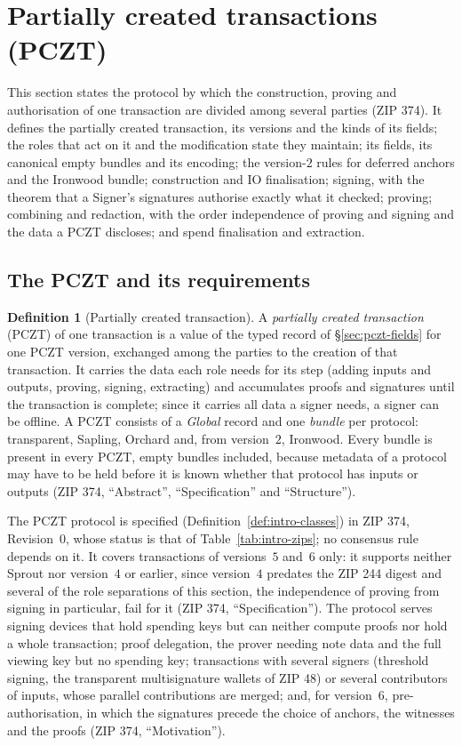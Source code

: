 \documentclass[11pt,a4paper]{article}
\theoremstyle{definition}
\newtheorem{definition}[theorem]{Definition}
\begin{document}
\section{Partially created transactions (PCZT)}\label{sec:pczt}

This section states the protocol by which the construction, proving and
authorisation of one transaction are divided among several parties (ZIP
374). It defines the partially created transaction, its versions and the
kinds of its fields; the roles that act on it and the modification state
they maintain; its fields, its canonical empty bundles and its encoding; the
version-$2$ rules for deferred anchors and the Ironwood bundle; construction
and IO finalisation; signing, with the theorem that a Signer's signatures
authorise exactly what it checked; proving; combining and redaction, with
the order independence of proving and signing and the data a PCZT
discloses; and spend finalisation and extraction.

\subsection{The PCZT and its requirements}\label{sec:pczt-object}

\begin{definition}[Partially created transaction]\label{def:pczt}
A \emph{partially created transaction} (PCZT) of one transaction is a value
of the typed record of \S\ref{sec:pczt-fields} for one PCZT version,
exchanged among the parties to the creation of that transaction. It carries
the data each role needs for its step (adding inputs and outputs, proving,
signing, extracting) and accumulates proofs and signatures until the
transaction is complete; since it carries all data a signer needs, a signer
can be offline. A PCZT consists of a \emph{Global} record and one
\emph{bundle} per protocol: transparent, Sapling, Orchard and, from
version~$2$, Ironwood. Every bundle is present in every PCZT, empty bundles
included, because metadata of a protocol may have to be held before it is
known whether that protocol has inputs or outputs (ZIP 374, ``Abstract'',
``Specification'' and ``Structure'').
\end{definition}

The PCZT protocol is specified (Definition~\ref{def:intro-classes}) in ZIP
374, Revision~$0$, whose status is that of Table~\ref{tab:intro-zips}; no
consensus rule depends on it. It covers transactions of versions~$5$
and~$6$ only: it supports neither Sprout nor version~$4$ or earlier, since
version~$4$ predates the ZIP 244 digest and several of the role separations
of this section, the independence of proving from signing in particular,
fail for it (ZIP 374, ``Specification''). The protocol serves signing
devices that hold spending keys but can neither compute proofs nor hold a
whole transaction; proof delegation, the prover needing note data and the
full viewing key but no spending key; transactions with several signers
(threshold signing, the transparent multisignature wallets of ZIP 48) or
several contributors of inputs, whose parallel contributions are merged;
and, for version~$6$, pre-authorisation, in which the signatures precede the
choice of anchors, the witnesses and the proofs (ZIP 374, ``Motivation'').
\end{document}
